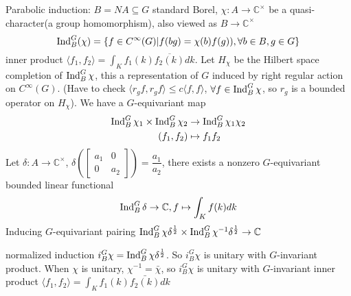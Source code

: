\documentclass[main]{subfiles}
\begin{document}
Parabolic induction: $B=NA\subseteq G$ standard Borel, $\chi:A\to \mathbb C^\times$ be a quasi-character(a group homomorphism), also viewed as $B\to\mathbb C^\times$
\[\operatorname{Ind}^G_B(\chi)=\{f\in C^\infty(G)|f(bg)=\chi(b)f(g)),\forall b\in B,g\in G\}\]
inner product $\langle f_1,f_2\rangle=\int_Kf_1(k)\overline{f_2(k)}dk$. Let $H_\chi$ be the Hilbert space completion of $\operatorname{Ind}^G_B\chi$, this a representation of $G$ induced by right regular action on $C^\infty(G)$. (Have to check $\langle r_gf,r_gf\rangle\leq c\langle f,f\rangle$, $\forall f\in\operatorname{Ind}^G_B\chi$, so $r_g$ is a bounded operator on $H_\chi$). We have a $G$-equivariant map
\begin{align*}
\operatorname{Ind}^G_B\chi_1\times\operatorname{Ind}^G_B\chi_2&\to\operatorname{Ind}^G_B\chi_1\chi_2 \\
(f_1,f_2)&\mapsto f_1f_2
\end{align*}
Let $\delta:A\to\mathbb C^\times$, $\delta\left(\begin{bmatrix}
a_1&0\\
0&a_2
\end{bmatrix}\right)=\dfrac{a_1}{a_2}$, there exists a nonzero $G$-equivariant bounded linear functional
\[\operatorname{Ind}^G_B\delta\to\mathbb C,f\mapsto\int_Kf(k)dk\]
Inducing $G$-equivariant pairing $\operatorname{Ind}^G_B\chi\delta^{\frac{1}{2}}\times\operatorname{Ind}^G_B\chi^{-1}\delta^{\frac{1}{2}}\to\mathbb C$

\begin{definition}
normalized induction $i^G_B\chi=\operatorname{Ind}^G_B\chi\delta^{\frac{1}{2}}$. So $i^G_B\chi$ is unitary with $G$-invariant product. When $\chi$ is unitary, $\chi^{-1}=\bar\chi$, so $i^G_B\chi$ is unitary with $G$-invariant inner product $\langle f_1,f_2\rangle=\int_Kf_1(k)\bar{f_2(k)}dk$
\end{definition}
\end{document}
